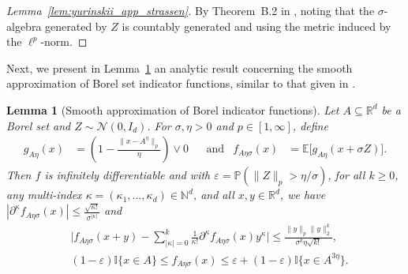 \documentclass[11pt,lof]{puthesis}
\renewcommand{\P}{\ensuremath{\mathbb{P}}}
\newcommand{\N}{\ensuremath{\mathbb{N}}}
\newcommand{\R}{\ensuremath{\mathbb{R}}}
\newcommand{\E}{\ensuremath{\mathbb{E}}}
\newcommand{\I}{\ensuremath{\mathbb{I}}}
\newcommand{\cN}{\ensuremath{\mathcal{N}}}
\theoremstyle{break}
\newtheorem{lemma}{Lemma}[section]
\theoremstyle{proof}
\newtheorem{proof}{Proof}
\begin{document}
\begin{proof}[Lemma~\ref{lem:yurinskii_app_strassen}]
  By Theorem~B.2 in \citet{chen2020jackknife}, noting that the $\sigma$-algebra
  generated by $Z$ is countably generated and using the metric induced by the
  $\ell^p$-norm.
\end{proof}

Next, we present in Lemma~\ref{lem:yurinskii_app_smooth_approximation} an
analytic result
concerning the smooth approximation of Borel set indicator functions, similar
to that given in \citet[Lemma~39]{belloni2019conditional}.

\begin{lemma}[Smooth approximation of Borel indicator functions]%
  \label{lem:yurinskii_app_smooth_approximation}
  Let $A \subseteq \R^d$ be a Borel set and $Z \sim \cN(0, I_d)$.
  For $\sigma, \eta > 0$ and $p \in [1, \infty]$, define
  \begin{align*}
    g_{A\eta}(x)
    &=
    \left( 1 - \frac{\|x-A^\eta\|_p}{\eta} \right) \vee 0
    & &\text{and}
    &f_{A\eta\sigma}(x)
    &=
    \E\big[g_{A\eta}(x + \sigma Z) \big].
  \end{align*}
  Then $f$ is infinitely differentiable
  and with $\varepsilon = \P(\|Z\|_p > \eta / \sigma)$,
  for all $k \geq 0$,
  any multi-index $\kappa = (\kappa_1,\dots, \kappa_d)\in\N^d$,
  and all $x,y \in \R^d$,
  we have $|\partial^\kappa f_{A\eta\sigma}(x)| \leq
  \frac{\sqrt{\kappa!}}{\sigma^{|\kappa|}}$ and
  \begin{align*}
    &\Bigg|
    f_{A\eta\sigma}(x+y) - \sum_{|\kappa| = 0}^k
    \frac{1}{\kappa!}
    \partial^\kappa f_{A\eta\sigma}(x)
    y^\kappa
    \Bigg|
    \leq
    \frac{\|y\|_p \|y\|_2^k}{\sigma^k \eta \sqrt{k!}}, \\
    &(1 - \varepsilon) \I\big\{x \in A\big\}
    \leq f_{A\eta\sigma}(x)
    \leq \varepsilon + (1 - \varepsilon)
    \I\big\{x \in A^{3\eta}\big\}.
  \end{align*}
\end{lemma}
\end{document}
